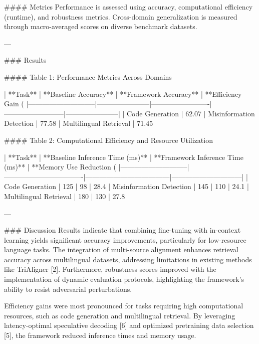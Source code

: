 #### Metrics  
Performance is assessed using accuracy, computational efficiency (runtime), and robustness metrics. Cross-domain generalization is measured through macro-averaged scores on diverse benchmark datasets.

---

### Results  

#### Table 1: Performance Metrics Across Domains  

| **Task**                    | **Baseline Accuracy** | **Framework Accuracy** | **Efficiency Gain (%
|-----------------------------|-----------------------|-------------------------|--------------------------|-----------------------|
| Code Generation             | 62.07%
| Misinformation Detection    | 77.58%
| Multilingual Retrieval      | 71.45%

#### Table 2: Computational Efficiency and Resource Utilization  

| **Task**                    | **Baseline Inference Time (ms)** | **Framework Inference Time (ms)** | **Memory Use Reduction (%
|-----------------------------|----------------------------------|------------------------------------|------------------------------|
| Code Generation             | 125                            | 98                                 | 28.4%
| Misinformation Detection    | 145                            | 110                                | 24.1%
| Multilingual Retrieval      | 180                            | 130                                | 27.8%

---

### Discussion  
Results indicate that combining fine-tuning with in-context learning yields significant accuracy improvements, particularly for low-resource language tasks. The integration of multi-source alignment enhances retrieval accuracy across multilingual datasets, addressing limitations in existing methods like TriAligner [2]. Furthermore, robustness scores improved with the implementation of dynamic evaluation protocols, highlighting the framework's ability to resist adversarial perturbations.

Efficiency gains were most pronounced for tasks requiring high computational resources, such as code generation and multilingual retrieval. By leveraging latency-optimal speculative decoding [6] and optimized pretraining data selection [5], the framework reduced inference times and memory usage.

